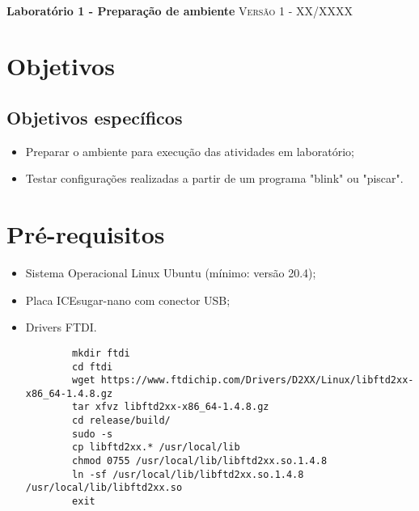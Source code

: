 \documentclass{article}
\begin{document}

    \begin{flushleft}
       {\large \textbf {\\[0.02in] Laboratório 1 - Preparação de ambiente}}
       { \textsc {\newline Versão 1 - XX/XXXX}}
    \end{flushleft}

\section{Objetivos}
 
\subsection{Objetivos específicos}
\begin{itemize}
    \item Preparar o ambiente para execução das atividades em laboratório;
    \item Testar configurações realizadas a partir de um programa "blink" ou "piscar".
    
\end{itemize}
\section{Pré-requisitos}
\begin{itemize}
    \item Sistema Operacional Linux Ubuntu (mínimo: versão 20.4);
    \item Placa ICEsugar-nano com conector USB;
    \item Drivers FTDI.
    \textnormal \newline{\vspace{-0.5mm}}
    \textnormal {}
    
    \begin{verbatim}
        mkdir ftdi
        cd ftdi
        wget https://www.ftdichip.com/Drivers/D2XX/Linux/libftd2xx-x86_64-1.4.8.gz
        tar xfvz libftd2xx-x86_64-1.4.8.gz
        cd release/build/
        sudo -s 
        cp libftd2xx.* /usr/local/lib
        chmod 0755 /usr/local/lib/libftd2xx.so.1.4.8
        ln -sf /usr/local/lib/libftd2xx.so.1.4.8 /usr/local/lib/libftd2xx.so
        exit
    \end{verbatim}
    
\end{itemize}
\end{document}
